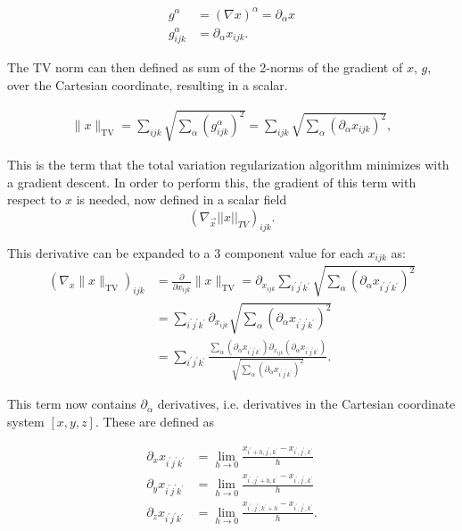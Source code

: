 \begin{align}
g^\alpha &=\left(\nabla x\right)^\alpha=\partial_\alpha x\\
g^\alpha_{ijk} & = \partial_\alpha x_{ijk}.
\end{align}

The TV norm can  then defined as sum of the 2-norms of the gradient of $x$, $g$, over the Cartesian coordinate, resulting in a scalar.

\begin{align}
\lVert x \rVert_\text{TV}=\sum\limits_{ijk} \sqrt{\sum\limits_\alpha \left(g^\alpha_{ijk}\right)^2}=\sum\limits_{ijk} \sqrt{\sum\limits_\alpha \left(\partial_\alpha x_{ijk}\right)^2},
\end{align}

This is the term that the total variation regularization algorithm minimizes with a gradient descent. In order to perform this, the gradient of this term with respect to $x$ is needed, now defined in a scalar field
\begin{equation}
 (\nabla_{\vec{x}} || x ||_{TV})_{ijk}.
\end{equation} 

This derivative can be expanded to a 3 component value for each $x_{ijk}$ as:
\begin{align}
\left(\nabla_x \lVert x \rVert_\text{TV}\right)_{ijk}&= \frac{\partial}{\partial x_{ijk}} \lVert x \rVert_\text{TV} = \partial_{x_{ijk}} \sum\limits_{i^\prime j^\prime k^\prime} \sqrt{\sum\limits_\alpha \left(\partial_\alpha x_{i^\prime j^\prime k^\prime}\right)^2}\nonumber
\\
&= \sum\limits_{i^\prime j^\prime k^\prime} \partial_{x_{ijk}}\sqrt{\sum\limits_\alpha \left(\partial_\alpha x_{i^\prime j^\prime k^\prime}\right)^2} \nonumber \\ 
&=\sum\limits_{i^\prime j^\prime k^\prime} \frac{\sum_\alpha\left(\partial_\alpha x_{i^\prime j^\prime k^\prime}\right) \partial_{x_{ijk}} \left(\partial_\alpha x_{i^\prime j^\prime k^\prime}\right)}{\sqrt{\sum\limits_\alpha \left(\partial_\alpha x_{i^\prime j^\prime k^\prime}\right)^2}}.\label{eq:gradientTVdisc}
\end{align}

This term now contains $\partial_\alpha$ derivatives, i.e. derivatives in the Cartesian coordinate system $[x,y,z]$. These are defined as

\begin{align}
\partial_x x_{i^\prime j^\prime k^\prime} &= \lim\limits_{h\to 0} \frac{x_{i^\prime+h,j^\prime,k^\prime}-x_{i^\prime, j^\prime, k^\prime}}{h} \nonumber \\
\partial_y x_{i^\prime j^\prime k^\prime} &= \lim\limits_{h\to 0} \frac{x_{i^\prime,j^\prime+h,k^\prime}-x_{i^\prime, j^\prime, k^\prime}}{h} \nonumber \\
\partial_z x_{i^\prime j^\prime k^\prime} &= \lim\limits_{h\to 0} \frac{x_{i^\prime,j^\prime,k^\prime+h}-x_{i^\prime, j^\prime, k^\prime}}{h}.\label{eq:derivativedef}
\end{align}

